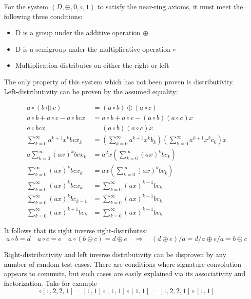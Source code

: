 \documentclass{article}
\begin{document}
For the system $(D, \oplus, 0, \circ, 1)$ to satisfy the near-ring axioms, it must meet the following three conditions:

\begin{itemize}
\item D is a group under the additive operation $\oplus$
\item D is a semigroup under the multiplicative operation $\circ$
\item Multiplication distributes on either the right or left
\end{itemize}

\noindent The only property of this system which has not been proven is distributivity. Left-distributivity can be proven by the assumed equality:

\begin{align*}
a \circ (b \oplus c) &= (a \circ b) \oplus (a \circ c)\\
a \circ b + a \circ c - a \circ bcx &= a \circ b + a \circ c - (a \circ b)(a \circ c)x\\
a \circ bcx &= (a \circ b)(a \circ c)x\\
\sum_{k=0}^{\infty} a^{k+1} x^k bcx_k &= (\sum_{k=0}^{\infty} a^{k+1} x^k b_k)(\sum_{k=0}^{\infty} a^{k+1} x^k c_k)x\\
a \sum_{k=0}^{\infty} (ax)^k bcx_k &= a^2 x (\sum_{k=0}^{\infty} (ax)^k bc_k)\\
\sum_{k=0}^{\infty} (ax)^k bcx_k &= ax (\sum_{k=0}^{\infty} (ax)^k bc_k)\\
\sum_{k=0}^{\infty} (ax)^k bcx_k &= \sum_{k=0}^{\infty} (ax)^{k+1} bc_k\\
\sum_{k=0}^{\infty} (ax)^k bc_{k-1} &= \sum_{k=0}^{\infty} (ax)^{k+1} bc_k\\
\sum_{k=0}^{\infty} (ax)^{k+1} bc_k &= \sum_{k=0}^{\infty} (ax)^{k+1} bc_k
\end{align*}

\noindent It follows that its right inverse right-distributes: \begin{equation}a \circ b = d \quad a \circ c = e \quad a \circ(b \oplus c) = d \oplus e \quad \Rightarrow \quad (d \oplus e) / a = d/a \oplus e/a = b \oplus c\end{equation}

\noindent Right-distributivity and left inverse distributivity can be disproven by any number of random test cases. There are conditions where signature convolution appears to commute, but such cases are easily explained via its associativity and factorization. Take for example \begin{equation}[1, 1] \circ [1, 2, 2, 1] = [1, 1] \circ [1, 1] \circ [1, 1] = [1, 2, 2, 1] \circ [1, 1]\end{equation}
\end{document}
